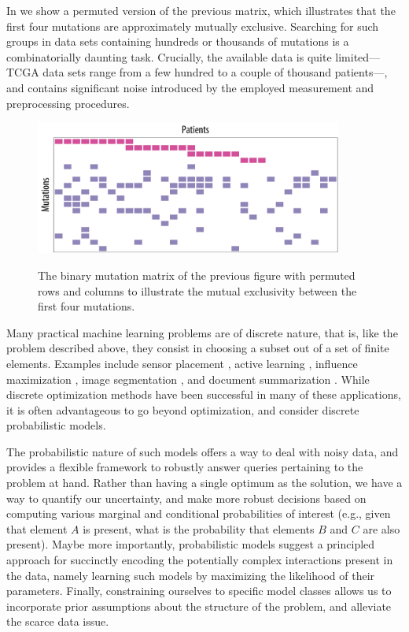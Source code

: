 In  we show a permuted version of the previous matrix, which illustrates that the first four mutations are approximately mutually exclusive.
Searching for such groups in data sets containing hundreds or thousands of mutations is a combinatorially daunting task.
Crucially, the available data is quite limited---TCGA data sets range from a few hundred to a couple of thousand patients---, and contains significant noise introduced by the employed measurement and preprocessing procedures.

\begin{figure}[tb]
\centering
\includegraphics[width=0.9\textwidth]{figures/intro/example1_rep.pdf}\\[1em]
\caption{The binary mutation matrix of the previous figure with permuted rows and columns to illustrate the mutual exclusivity between the first four mutations.}
\label{fig:bamat_2}
\end{figure}

Many practical machine learning problems are of discrete nature, that is, like the problem described above, they consist in choosing a subset out of a set of finite elements.
Examples include sensor placement \citep{krause06}, active learning \citep{golovin11}, influence maximization \citep{kempe03}, image segmentation \citep{jegelka11}, and document summarization \citep{lin11}.
While discrete optimization methods have been successful in many of these applications, it is often advantageous to go beyond optimization, and consider discrete probabilistic models.

The probabilistic nature of such models offers a way to deal with noisy data, and provides a flexible framework to robustly answer queries pertaining to the problem at hand.
Rather than having a single optimum as the solution, we have a way to quantify our uncertainty, and make more robust decisions based on computing various marginal and conditional probabilities of interest (e.g., given that element $A$ is present, what is the probability that elements $B$ and $C$ are also present).
Maybe more importantly, probabilistic models suggest a principled approach for succinctly encoding the potentially complex interactions present in the data, namely learning such models by maximizing the likelihood of their parameters.
Finally, constraining ourselves to specific model classes allows us to incorporate prior assumptions about the structure of the problem, and alleviate the scarce data issue.

